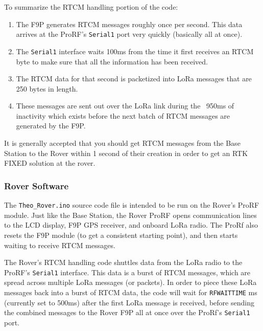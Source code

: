 \documentclass{article}%
\begin{document}
To summarize the RTCM handling portion of the code:
\begin{enumerate}
	\item The F9P generates RTCM messages roughly once per second.  This data arrives at the ProRF's \texttt{Serial1} port very quickly (basically all at once).
	\item The \texttt{Serial1} interface waits 100ms from the time it first receives an RTCM byte to make sure that all the information has been received.
	\item The RTCM data for that second is packetized into LoRa messages that are 250 bytes in length.
	\item These messages are sent out over the LoRa link during the ~950ms of inactivity which exists before the next batch of RTCM messages are generated by the F9P.
\end{enumerate}   
\begin{myquote}It is generally accepted that you should get RTCM messages from the Base Station to the Rover within 1 second of their creation in order to get an RTK FIXED solution at the rover.
\end{myquote}

\subsubsection{Rover Software}
The \texttt{Theo\_Rover.ino} source code file is intended to be run on the Rover's ProRF module.  Just like the Base Station, the Rover ProRF opens communication lines to the LCD display, F9P GPS receiver, and onboard LoRa radio. The ProRf also resets the F9P module (to get a consistent starting point), and then starts waiting to receive RTCM messages.

The Rover's RTCM handling code shuttles data from the LoRa radio to the ProRF's \texttt{Serial1} interface.  This data is a burst of RTCM messages, which are spread across multiple LoRa messages (or packets).  In order to piece these LoRa messages back into a burst of RTCM data, the code will wait for \texttt{RFWAITTIME} ms (currently set to 500ms) after the first LoRa message is received, before sending the combined messages to the Rover F9P all at once over the ProRf's \texttt{Serial1} port.
\end{document}
